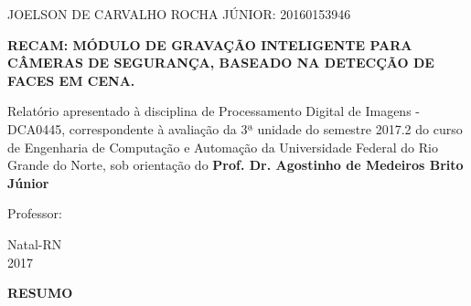 \documentclass[a4paper,12pt]{article}
\begin{document}
\newpage


\thispagestyle{empty}

\begin{center}
\begin{normalsize}

JOELSON DE CARVALHO ROCHA JÚNIOR: 20160153946\\
\vspace{0.8cm}
 

\end{normalsize}
\end{center}
\vspace{3cm}

{\bf{\large \centering RECAM: MÓDULO DE GRAVAÇÃO INTELIGENTE PARA CÂMERAS DE SEGURANÇA, BASEADO NA DETECÇÃO DE FACES EM CENA.
	}}

\vspace{4cm}

\begin{adjustwidth}{7.5cm}{0cm}

{\normalsize

Relatório apresentado à disciplina de
Processamento Digital de Imagens - DCA0445, correspondente à
avaliação da 3ª unidade do semestre 2017.2 do curso de Engenharia de Computação e Automação da
Universidade Federal do Rio Grande do Norte, sob
orientação do {\bf Prof. Dr. Agostinho de Medeiros Brito Júnior}
}

\end{adjustwidth}

\vspace{2cm}

\begin{center}

Professor:  \\ 

\vspace{5.0cm}

{\large Natal-RN\\
2017}

\end{center}

\newpage


\thispagestyle{empty}

\begin{center}
{\large \textbf{RESUMO}}
\end{center}
\end{document}

